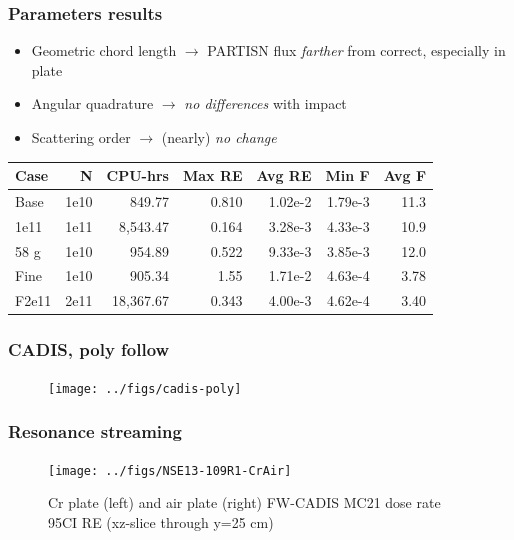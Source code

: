 \documentclass[xcolor=x11names,compress, handout]{beamer}
\renewcommand{\(}{\begin{columns}}
\renewcommand{\)}{\end{columns}}
\newcommand{\<}[1]{\begin{column}{#1}}
\renewcommand{\>}{\end{column}}
\begin{document}
\begin{frame}[fragile]
  \frametitle{Parameters results}
  
  	\begin{itemize}
  	\item Geometric chord length $\rightarrow$ PARTISN flux \textit{farther} from correct, especially in plate
  	\item Angular quadrature $\rightarrow$ \textit{no differences} with impact
	\item Scattering order $\rightarrow$ (nearly) \textit{no change}
  	\end{itemize}
  	
  \begin{center}
    \begin{tabu}{|l|r|r|r|r|r|r|}\hline
      Case & N & CPU-hrs & Max RE & Avg RE & Min F & Avg F\\\hline
Base      & 1e10 & 849.77    & 0.810 & 1.02e-2 & 1.79e-3 & 11.3\\
%
1e11 & 1e11 & 8,543.47  & 0.164 & 3.28e-3 & \alert{4.33e-3} & 10.9\\
%
58 g & 1e10 & 954.89    & 0.522 & 9.33e-3 & \alert{3.85e-3} & 12.0\\
%
Fine & 1e10 & 905.34    & 1.55  & 1.71e-2 & 4.63e-4 & 3.78\\
%
F2e11 & 2e11 & 18,367.67 & 0.343 & 4.00e-3 & 4.62e-4 & 3.40\\\hline
    \end{tabu}
  \end{center}

\end{frame}


\begin{frame}[fragile]
  \frametitle{CADIS, poly follow}
 \begin{figure}[p]
   \begin{center}
     \texttt{[image: ../figs/cadis-poly]}
   \end{center}
 \end{figure}
\end{frame}


\begin{frame}[fragile]
  \frametitle{Resonance streaming}
   \begin{figure}[p]
   \begin{center}
     \texttt{[image: ../figs/NSE13-109R1-CrAir]}
   \end{center}
   \caption{Cr plate (left) and air plate (right) FW-CADIS MC21 dose rate 95CI RE (xz-slice through y=25 cm)}
   \label{fig:CrAir}
 \end{figure}
\end{frame}
\end{document}
